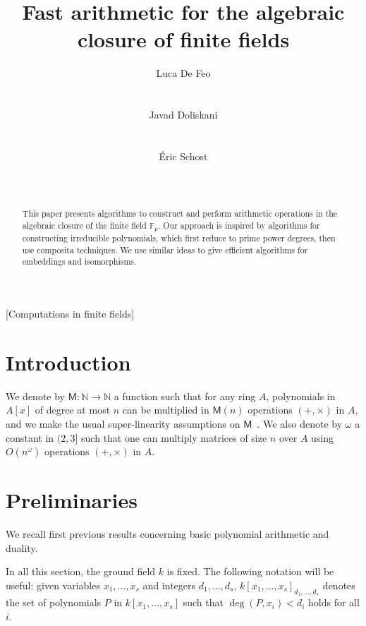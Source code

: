 \documentclass{sig-alternate}
\author{
  \alignauthor Luca De Feo\\
  \affaddr{Laboratoire PRiSM}\\
  \affaddr{Universit\'e de Versailles}\\
  \email{luca.de-feo@uvsq.fr}
  \alignauthor Javad Doliskani\\
  \affaddr{Computer Science Department}\\
  \affaddr{Western University}\\
  \email{jdoliska@uwo.ca}
  \alignauthor \'Eric Schost\\
  \affaddr{Computer Science Department}\\
  \affaddr{Western University}\\
  \email{eschost@uwo.ca}
}
\title{Fast arithmetic for the algebraic closure of finite fields}
\def\M {\ensuremath{\mathsf{M}}}
\def\N {\ensuremath{\mathbb{N}}}
\begin{document}
\maketitle
\begin{abstract}
  This paper presents algorithms to construct and perform arithmetic
  operations in the algebraic closure of the finite field
  $\mathbb{F}_p$. Our approach is inspired by algorithms for
  constructing irreducible polynomials, which first reduce to prime
  power degrees, then use composita techniques. We use similar ideas to
  give efficient algorithms for embeddings and isomorphisms.
\end{abstract}

[Computations in finite fields]


\section{Introduction}

We denote by $\M:\N \to \N$ a function such that for any ring $A$,
polynomials in $A[x]$ of degree at most $n$ can be multiplied in
$\M(n)$ operations $(+,\times)$ in $A$, and we make the usual
super-linearity assumptions on $\M$~\cite[Chapter~8]{vzGG}. We also
denote by $\omega$ a constant in $(2,3]$ such that one can multiply
  matrices of size $n$ over $A$ using $O(n^\omega)$ operations
  $(+,\times)$ in $A$.


\section{Preliminaries}

We recall first previous results concerning basic polynomial
arithmetic and duality. 

In all this section, the ground field $k$ is fixed. The following
notation will be useful: given variables $x_1,\dots,x_s$ and integers
$d_1,\dots,d_s$, $k[x_1,\dots,x_s]_{d_1,\dots,d_s}$ denotes the set of
polynomials $P$ in $k[x_1,\dots,x_s]$ such that $\deg(P,x_i) < d_i$
holds for all $i$.
\end{document}
